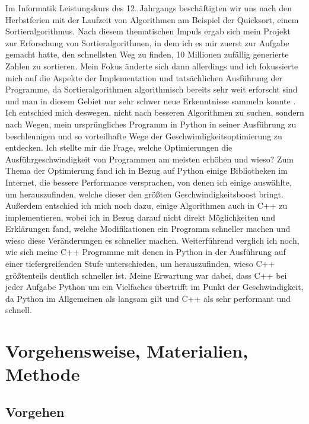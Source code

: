 \documentclass[11pt,a4paper]{article}
\begin{document}
Im Informatik Leistungskurs des 12. Jahrgangs beschäftigten wir uns nach den Herbstferien mit
der Laufzeit von Algorithmen am Beispiel der Quicksort, einem Sortieralgorithmus.
Nach diesem thematischen Impuls ergab sich mein Projekt zur Erforschung von Sortieralgorithmen,
in dem ich es mir zuerst zur Aufgabe gemacht hatte, den schnellsten Weg zu finden, 10 Millionen zufällig
generierte Zahlen zu sortieren. Mein Fokus änderte sich dann allerdings und ich fokussierte mich
auf die Aspekte der Implementation und tatsächlichen Ausführung der Programme, da 
Sortieralgorithmen algorithmisch bereits sehr weit erforscht sind und man in diesem Gebiet nur
sehr schwer neue Erkenntnisse sammeln konnte \cite{sortieralgorithmenwikipedia}.
Ich entschied mich deswegen, nicht nach besseren Algorithmen zu suchen, sondern nach Wegen, 
mein ursprüngliches Programm in Python in seiner Ausführung zu beschleunigen und so vorteilhafte
Wege der Geschwindigkeitsoptimierung zu entdecken.
Ich stellte mir die Frage, welche Optimierungen die Ausführgeschwindigkeit von Programmen
am meisten erhöhen und wieso?
Zum Thema der Optimierung fand ich in Bezug auf Python einige Bibliotheken im Internet, die
bessere Performance versprachen, von denen ich einige auswählte, um herauszufinden,
welche dieser den größten Geschwindigkeitsboost bringt.
Außerdem entschied ich mich noch dazu, einige Algorithmen auch in C++ zu implementieren, wobei ich in Bezug
darauf nicht direkt Möglichkeiten und Erklärungen fand, welche Modifikationen ein Programm schneller machen und
wieso diese Veränderungen es schneller machen.
Weiterführend verglich ich noch, wie sich meine C++ Programme mit denen in Python in der Ausführung auf einer
tiefergreifenden Stufe unterschieden, um herauszufinden, wieso C++ größtenteils deutlich schneller ist.
Meine Erwartung war dabei, dass C++ bei jeder Aufgabe Python um ein Vielfaches übertrifft im Punkt der Geschwindigkeit,
da Python im Allgemeinen als langsam gilt und C++ als sehr performant und schnell.

\clearpage

\section{Vorgehensweise, Materialien, Methode}

\subsection{Vorgehen}
\end{document}
